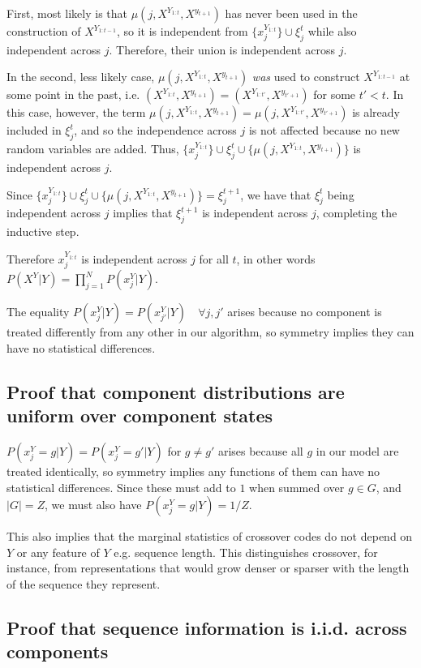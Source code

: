 \documentclass{article}
\begin{document}
\begin{appendices}
First, most likely is that $\mu(j, X^{Y_{1:t}}, X^{y_{t+1}})$ has never been used in the construction of $X^{Y_{1:t-1}}$, so it is independent from $\{x_j^{Y_{1:t}}\} \cup \xi^t_j$ while also independent across $j$. Therefore, their union is independent across $j$.

In the second, less likely case, $\mu(j, X^{Y_{1:t}}, X^{y_{t+1}})$ \textit{was} used to construct $X^{Y_{1:t-1}}$ at some point in the past, i.e. $(X^{Y_{1:t}}, X^{y_{t+1}}) = (X^{Y_{1:t'}}, X^{y_{t'+1}})$ for some $t' < t$. In this case, however, the term $\mu(j, X^{Y_{1:t}}, X^{y_{t+1}}) = \mu(j, X^{Y_{1:t'}}, X^{y_{t'+1}})$ is already included in $\xi^t_j$, and so the independence across $j$ is not affected because no new random variables are added. Thus, $\{x_j^{Y_{1:t}}\} \cup \xi^t_j \cup \{\mu(j, X^{Y_{1:t}}, X^{y_{t+1}})\}$ is independent across $j$.

Since $\{x_j^{Y_{1:t}}\} \cup \xi^t_j \cup \{\mu(j, X^{Y_{1:t}}, X^{y_{t+1}})\} = \xi^{t+1}_j$, we have that $\xi^t_j$ being independent across $j$ implies that $\xi^{t+1}_j$ is independent across $j$, completing the inductive step.

Therefore $x_j^{Y_{1:t}}$ is independent across $j$ for all $t$, in other words $P(X^Y|Y) = \prod\limits_{j=1}^N P(x^Y_j|Y)$.

The equality $P(x^Y_j|Y) = P(x^Y_{j'}|Y) \quad \forall j, j'$ arises because no component is treated differently from any other in our algorithm, so symmetry implies they can have no statistical differences.

\subsection{Proof that component distributions are uniform over component states}

$P(x^Y_j = g|Y) = P(x^Y_j = g'|Y)$ for $g \neq g'$ arises because all $g$ in our model are treated identically, so symmetry implies any functions of them can have no statistical differences. Since these must add to $1$ when summed over $g \in G$, and $|G| = Z$, we must also have $P(x^Y_j = g|Y) = 1/Z.$

This also implies that the marginal statistics of crossover codes do not depend on $Y$ or any feature of $Y$ e.g. sequence length. This distinguishes crossover, for instance, from representations that would grow denser or sparser with the length of the sequence they represent.

\subsection{Proof that sequence information is i.i.d. across components}


\end{appendices}
\end{document}
